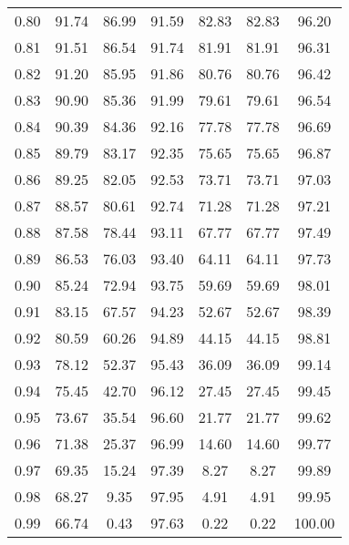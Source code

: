 \begin{tabular}{|c|c|c|c|c|c|c|}
      0.80 &     91.74 &     86.99 &      91.59 &   82.83 &      82.83 &         96.20 \\
      0.81 &     91.51 &     86.54 &      91.74 &   81.91 &      81.91 &         96.31 \\
      0.82 &     91.20 &     85.95 &      91.86 &   80.76 &      80.76 &         96.42 \\
      0.83 &     90.90 &     85.36 &      91.99 &   79.61 &      79.61 &         96.54 \\
      0.84 &     90.39 &     84.36 &      92.16 &   77.78 &      77.78 &         96.69 \\
      0.85 &     89.79 &     83.17 &      92.35 &   75.65 &      75.65 &         96.87 \\
      0.86 &     89.25 &     82.05 &      92.53 &   73.71 &      73.71 &         97.03 \\
      0.87 &     88.57 &     80.61 &      92.74 &   71.28 &      71.28 &         97.21 \\
      0.88 &     87.58 &     78.44 &      93.11 &   67.77 &      67.77 &         97.49 \\
      0.89 &     86.53 &     76.03 &      93.40 &   64.11 &      64.11 &         97.73 \\
      0.90 &     85.24 &     72.94 &      93.75 &   59.69 &      59.69 &         98.01 \\
      0.91 &     83.15 &     67.57 &      94.23 &   52.67 &      52.67 &         98.39 \\
      0.92 &     80.59 &     60.26 &      94.89 &   44.15 &      44.15 &         98.81 \\
      0.93 &     78.12 &     52.37 &      95.43 &   36.09 &      36.09 &         99.14 \\
      0.94 &     75.45 &     42.70 &      96.12 &   27.45 &      27.45 &         99.45 \\
      0.95 &     73.67 &     35.54 &      96.60 &   21.77 &      21.77 &         99.62 \\
      0.96 &     71.38 &     25.37 &      96.99 &   14.60 &      14.60 &         99.77 \\
      0.97 &     69.35 &     15.24 &      97.39 &    8.27 &       8.27 &         99.89 \\
      0.98 &     68.27 &      9.35 &      97.95 &    4.91 &       4.91 &         99.95 \\
      0.99 &     66.74 &      0.43 &      97.63 &    0.22 &       0.22 &        100.00 \\
\bottomrule
\end{tabular}

